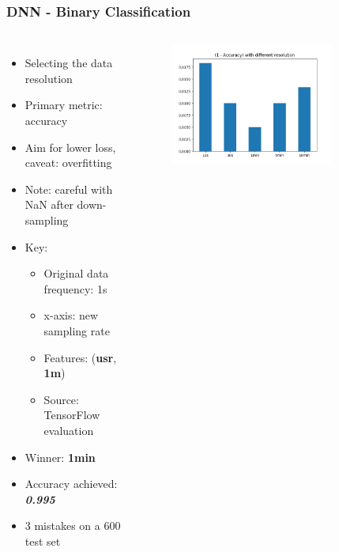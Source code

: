 \documentclass[aspectratio=169,11pt,hyperref={colorlinks=true}]{beamer}
\begin{document}
\begin{frame}
    \frametitle{DNN - Binary Classification}
    \begin{columns}
        \begin{itemize}
            \item{Selecting the data resolution}
            \item{Primary metric: accuracy}
            \item{Aim for lower loss, caveat: overfitting}
            \item{Note: careful with NaN after down-sampling}
            \item{Key:}
            \begin{itemize}
              \item{Original data frequency: 1s}
              \item{x-axis: new sampling rate}
              \item{Features: (\textbf{usr}, \textbf{1m})}
              \item{Source: TensorFlow evaluation}
            \end{itemize}
            \item{Winner: \textbf{1min}}
            \item{Accuracy achieved: \emph{\textbf{0.995}}}
            \item{3 mistakes on a 600 test set}
        \end{itemize}
        \begin{center}
        \begin{figure}
          \includegraphics[width=0.8\textwidth,height=0.4\textheight]{graphs/accuracy_by_sampling-status.png}
        \end{figure}

\end{center}
\end{columns}
\end{frame}
\end{document}
